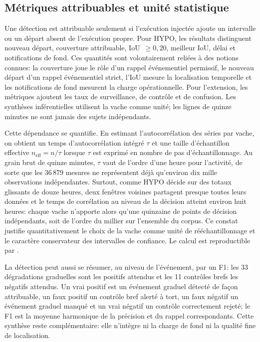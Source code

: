 \subsection{Métriques attribuables et unité statistique}

Une détection est attribuable seulement si l'exécution injectée ajoute un intervalle ou un
départ absent de l'exécution propre. Pour HYPO, les résultats distinguent nouveau départ,
couverture attribuable, IoU~$\geq0{,}20$, meilleur IoU, délai et notifications de fond. Ces
quantités sont volontairement reliées à des notions connues: la couverture joue le rôle d'un
rappel événementiel permissif, le nouveau départ d'un rappel événementiel strict, l'IoU mesure
la localisation temporelle et les notifications de fond mesurent la charge opérationnelle. Pour
l'extension, les métriques ajoutent les taux de surveillance, de contrôle et de confusion. Les
synthèses inférentielles utilisent la vache comme unité; les lignes de quinze minutes ne sont
jamais des sujets indépendants.

Cette dépendance se quantifie. En estimant l'autocorrélation des séries par vache, on obtient
un temps d'autocorrélation intégré $\tau$ et une taille d'échantillon effective
$n_{\text{eff}}=n/\tau$ lorsque $\tau$ est exprimé en nombre de pas d'échantillonnage. Au
grain brut de quinze minutes, $\tau$ vaut de l'ordre d'une heure pour l'activité, de sorte que
les 36\,879 mesures ne représentent déjà qu'environ dix mille observations indépendantes.
Surtout, comme HYPO décide sur des totaux glissants de douze heures, deux fenêtres voisines
partagent presque toutes leurs données et le temps de corrélation au niveau de la décision
atteint environ huit heures: chaque vache n'apporte alors qu'une quinzaine de points de
décision indépendants, soit de l'ordre du millier sur l'ensemble du corpus. Ce constat justifie
quantitativement le choix de la vache comme unité de rééchantillonnage et le caractère
conservateur des intervalles de confiance. Le calcul est reproductible par
.

La détection peut aussi se résumer, au niveau de l'événement, par un F1: les 33 dégradations
graduelles sont les positifs attendus et les 11 contrôles brefs les négatifs attendus. Un vrai
positif est un événement graduel détecté de façon attribuable, un faux positif un contrôle bref
alerté à tort, un faux négatif un événement graduel manqué et un vrai négatif un contrôle
correctement rejeté; le F1 est la moyenne harmonique de la précision et du rappel correspondants.
Cette synthèse reste complémentaire: elle n'intègre ni la charge de fond ni la qualité fine de
localisation.

